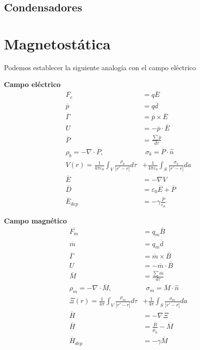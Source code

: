 \documentclass{myclass}
\begin{document}
\subsection{Condensadores}



\section{Magnetostática}
Podemos establecer la siguiente analogía con el campo eléctrico

\begin{minipage}{0.5\textwidth}
  \centering 
  \textbf{Campo eléctrico}
\begin{align*}
  \overline{F_e} &= q\overline{E} \\
  \overline{p} &= q \overline{d}\\
  \overline{\Gamma} &= \overline{p}\times \overline{E} \\
  U &= -\overline{p}\cdot \overline{E}\\
  \overline{P} &= \frac{\sum \overline{p}}{d\tau  }\\
  \rho _b = -\nabla\cdot \overline{P},& \ \  \sigma _b = \overline{P}\cdot \hat{n}\\
  V(r)=\frac{1}{4\pi\varepsilon _0}\int_V \frac{\rho _b}{ |r'-r|}d\tau &+ \frac{1}{4\pi\varepsilon _0}\int_S \frac{\sigma _b}{|r'-r|}da \\
  \overline{E} &= -\nabla V\\
  \overline{D} &= \varepsilon _0\overline{E} + \overline{P}\\
  \overline{E}_{dep} &= -\gamma \frac{\overline{P}}{\varepsilon _0}
\end{align*}
\end{minipage}
\begin{minipage}{0.5\textwidth}
  \centering
  \textbf{Campo magnético}
\begin{align*}
  \overline{F_m} &= q_m\overline{B} \\
  \overline{m} &= q_m \overline{d}\\
  \overline{\Gamma} &= \overline{m}\times \overline{B} \\
  U &= -\overline{m}\cdot \overline{B}\\
  \overline{M} &= \frac{\sum \overline{m}}{d\tau  }\\
  \rho _m = -\nabla\cdot \overline{M},& \ \  \sigma _m = \overline{M}\cdot \hat{n}\\
  \Xi(r)=\frac{1}{4\pi}\int_V \frac{\rho _m}{ |r'-r|}d\tau &+ \frac{1}{4\pi}\int_S \frac{\sigma _m}{|r'-r|}da\\
  \overline{H}&=-\nabla \Xi\\
  \overline{H} &= \frac{\overline{B}}{\mu_0} - \overline{M}\\
  \overline{H}_{dep} &= -\gamma \overline{M}
\end{align*}

\end{minipage}
\end{document}

